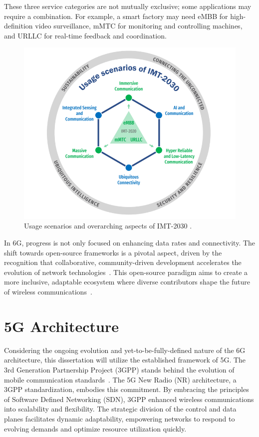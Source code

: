 These three service categories are not mutually exclusive; some applications may require a combination.
For example, a smart factory may need eMBB for high-definition video surveillance, mMTC for monitoring and controlling machines, and URLLC for real-time feedback and coordination.

\begin{figure}[H]
    \centering
    \includegraphics[width=0.5\linewidth]{figures/usage 6g}
    \caption[Usage scenarios and overarching aspects of IMT-2030]{Usage scenarios and overarching aspects of IMT-2030 \cite{ITU_2160-0}.}
    \label{fig:6g_usage}
\end{figure}

In 6G, progress is not only focused on enhancing data rates and connectivity.
The shift towards open-source frameworks is a pivotal aspect, driven by the recognition that collaborative, community-driven development accelerates the evolution of network technologies~\cite{6G_SOA}.
This open-source paradigm aims to create a more inclusive, adaptable ecosystem where diverse contributors shape the future of wireless communications~\cite{6G_SOA}.


\section{5G Architecture} \label{sec:5g_arch}

Considering the ongoing evolution and yet-to-be-fully-defined nature of the 6G architecture, this dissertation will utilize the established framework of 5G. The 3rd Generation Partnership Project (3GPP) stands behind the evolution of mobile communication standards~\cite{3GPP_about_us}.
The 5G New Radio (NR) architecture, a 3GPP standardization, embodies this commitment.
By embracing the principles of Software Defined Networking (SDN), 3GPP enhanced wireless communications into scalability and flexibility.
The strategic division of the control and data planes facilitates dynamic adaptability, empowering networks to respond to evolving demands and optimize resource utilization quickly.

